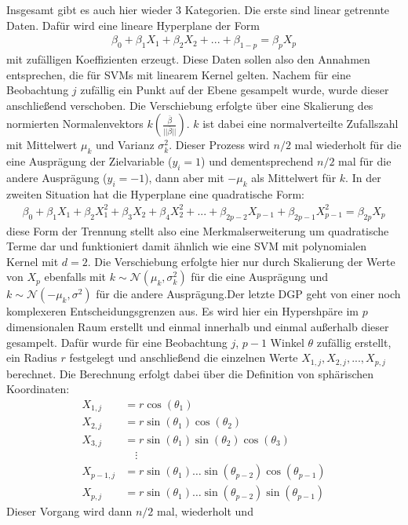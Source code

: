 \documentclass[
]{article}
\begin{document}
Insgesamt gibt es auch hier wieder 3 Kategorien. Die erste sind linear
getrennte Daten. Dafür wird eine lineare Hyperplane der Form
\begin{align*}
\beta_0+\beta_1 X_1+\beta_2 X_2 +...+\beta_{1-p} = \beta_p X_p
\end{align*} mit zufälligen Koeffizienten erzeugt. Diese Daten sollen
also den Annahmen entsprechen, die für SVMs mit linearem Kernel gelten.
Nachem für eine Beobachtung \(j\) zufällig ein Punkt auf der Ebene
gesampelt wurde, wurde dieser anschließend verschoben. Die Verschiebung
erfolgte über eine Skalierung des normierten Normalenvektors
\(k\left(\frac{\overline{\beta}}{||\overline{\beta}||}\right)\). \(k\)
ist dabei eine normalverteilte Zufallszahl mit Mittelwert \(\mu_k\) und
Varianz \(\sigma^2_k\). Dieser Prozess wird \(n/2\) mal wiederholt für
die eine Ausprägung der Zielvariable (\(y_i=1\)) und dementsprechend
\(n/2\) mal für die andere Ausprägung (\(y_i=-1\)), dann aber mit
\(-\mu_k\) als Mittelwert für \(k\). \newline In der zweiten Situation
hat die Hyperplane eine quadratische Form: \begin{align*}
\beta_0+\beta_1 X_1 + \beta_2 X_1^2+\beta_3 X_2+\beta_4 X_2^2+...+\beta_{2p-2}X_{p-1}+\beta_{2p-1}X_{p-1}^2=\beta_{2p} X_p
\end{align*} diese Form der Trennung stellt also eine
Merkmalserweiterung um quadratische Terme dar und funktioniert damit
ähnlich wie eine SVM mit polynomialen Kernel mit \(d=2\). Die
Verschiebung erfolgte hier nur durch Skalierung der Werte von \(X_p\)
ebenfalls mit \(k\sim\mathcal{N}(\mu_k,\sigma^2_k)\) für die eine
Ausprägung und \(k\sim\mathcal{N}(-\mu_k,\sigma^2)\) für die andere
Ausprägung.\newline  Der letzte DGP geht von einer noch komplexeren
Entscheidungsgrenzen aus. Es wird hier ein Hypershpäre im \(p\)
dimensionalen Raum erstellt und einmal innerhalb und einmal außerhalb
dieser gesampelt. Dafür wurde für eine Beobachtung \(j\), \(p-1\) Winkel
\(\theta\) zufällig erstellt, ein Radius \(r\) festgelegt und
anschließend die einzelnen Werte \(X_{1,j},X_{2,j},...,X_{p,j}\)
berechnet. Die Berechnung erfolgt dabei über die Definition von
sphärischen Koordinaten: \begin{align*}
        X_{1,j} &= r \cos(\theta_1)\\
        X_{2,j} &= r \sin(\theta_1)\cos(\theta_2)\\
        X_{3,j} &= r \sin(\theta_1)\sin(\theta_2)\cos(\theta_3)\\
        &\quad \vdots\\
        X_{p-1,j}&=r \sin(\theta_1)\ldots \sin(\theta_{p-2})\cos(\theta_{p-1})\\
        X_{p,j}&=r \sin(\theta_1)\ldots \sin(\theta_{p-2})\sin(\theta_{p-1})
    \end{align*} Dieser Vorgang wird dann \(n/2\) mal, wiederholt und
\end{document}
